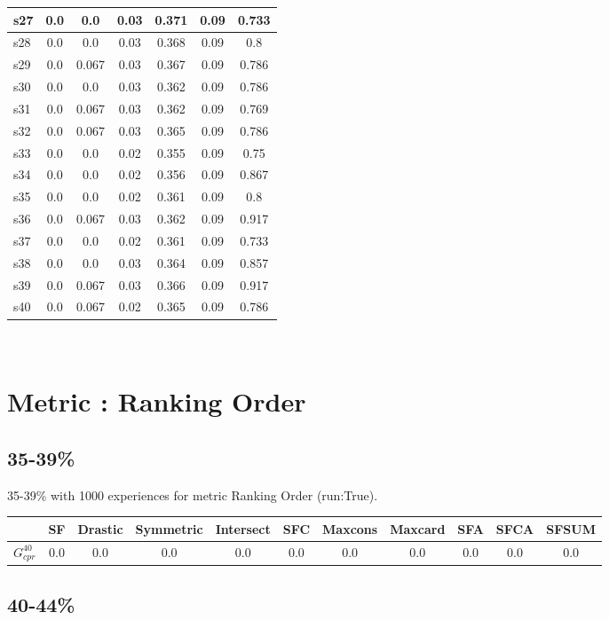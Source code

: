 \documentclass{article}
\newcommand{\graph}[2]{$G_{#1}^{#2}$}
\begin{document}
\begin{tabular}{|l|c|c|c|c|c|c|}
\hline
s27 &0.0 & 0.0 & 0.03 & 0.371 & 0.09 & 0.733\\
\hline
s28 &0.0 & 0.0 & 0.03 & 0.368 & 0.09 & 0.8\\
\hline
s29 &0.0 & 0.067 & 0.03 & 0.367 & 0.09 & 0.786\\
\hline
s30 &0.0 & 0.0 & 0.03 & 0.362 & 0.09 & 0.786\\
\hline
s31 &0.0 & 0.067 & 0.03 & 0.362 & 0.09 & 0.769\\
\hline
s32 &0.0 & 0.067 & 0.03 & 0.365 & 0.09 & 0.786\\
\hline
s33 &0.0 & 0.0 & 0.02 & 0.355 & 0.09 & 0.75\\
\hline
s34 &0.0 & 0.0 & 0.02 & 0.356 & 0.09 & 0.867\\
\hline
s35 &0.0 & 0.0 & 0.02 & 0.361 & 0.09 & 0.8\\
\hline
s36 &0.0 & 0.067 & 0.03 & 0.362 & 0.09 & 0.917\\
\hline
s37 &0.0 & 0.0 & 0.02 & 0.361 & 0.09 & 0.733\\
\hline
s38 &0.0 & 0.0 & 0.03 & 0.364 & 0.09 & 0.857\\
\hline
s39 &0.0 & 0.067 & 0.03 & 0.366 & 0.09 & 0.917\\
\hline
s40 &0.0 & 0.067 & 0.02 & 0.365 & 0.09 & 0.786\\
\hline
\end{tabular}\\

\newpage
\section{Metric : Ranking Order}

\newpage

\subsection{35-39\%}

35-39\% with 1000 experiences for metric Ranking Order (run:True).

\noindent\begin{tabular}{|l|c|c|c|c|c|c|c|c|c|c|}
\hline
& SF& Drastic& Symmetric& Intersect& SFC& Maxcons& Maxcard& SFA& SFCA& SFSUM\\
\hline
\graph{cpr}{40} &0.0&0.0&0.0&0.0&0.0&0.0&0.0&0.0&0.0&0.0\\
\hline
\end{tabular}
\newpage

\subsection{40-44\%}
\end{document}
